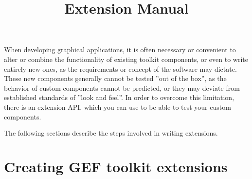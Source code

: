 
%
\title{Extension Manual}
\author*{}{}
\maketitle

\setcounter{tocdepth}{2}
\tableofcontents
\renewcommand{\bxcomment}[2]{}%
\clearpage

\setcounter{secnumdepth}{2}

When developing graphical applications, it is often necessary or
convenient to alter or combine the functionality of existing toolkit
components, or even to write entirely new ones, as the requirements or
concept of the software may dictate. These new components
generally cannot be tested ''out of the box'', as the
behavior of custom components cannot be predicted, or they may deviate
from established standards of ''look and feel''. In order to overcome this limitation, there is an extension
API, which you can use to be able to test your custom components.

The following sections describe the steps involved in writing extensions.

\clearpage



\clearpage

\chapter{Creating GEF toolkit extensions}


\clearpage



